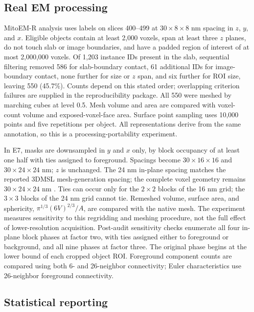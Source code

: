 \documentclass[journal]{IEEEtran}
\begin{document}
\subsection{Real EM processing}

MitoEM-R analysis uses labels on slices 400--499 at $30\times8\times8$ nm spacing in $z$, $y$, and $x$. Eligible objects contain at least 2,000 voxels, span at least three $z$ planes, do not touch slab or image boundaries, and have a padded region of interest of at most 2,000,000 voxels. Of 1,203 instance IDs present in the slab, sequential filtering removed 586 for slab-boundary contact, 61 additional IDs for image-boundary contact, none further for size or $z$ span, and six further for ROI size, leaving 550 (45.7\%). Counts depend on this stated order; overlapping criterion failures are supplied in the reproducibility package.
All 550 were meshed by marching cubes \cite{ref23} at level 0.5. Mesh volume and area are compared with voxel-count volume and exposed-voxel-face area. Surface point sampling uses 10,000 points and five repetitions per object. All representations derive from the same annotation, so this is a processing-portability experiment.

In E7, masks are downsampled in $y$ and $x$ only, by block occupancy of at least one half with ties assigned to foreground. Spacings become $30\times16\times16$ and $30\times24\times24$ nm; $z$ is unchanged. The 24 nm in-plane spacing matches the reported 3DMSL mesh-generation spacing; the complete voxel geometry remains $30\times24\times24$ nm \cite{ref20}. Ties can occur only for the $2\times2$ blocks of the 16 nm grid; the $3\times3$ blocks of the 24 nm grid cannot tie. Remeshed volume, surface area, and sphericity, $\pi^{1/3}(6V)^{2/3}/A$, are compared with the native mesh. The experiment measures sensitivity to this regridding and meshing procedure, not the full effect of lower-resolution acquisition. Post-audit sensitivity checks enumerate all four in-plane block phases at factor two, with ties assigned either to foreground or background, and all nine phases at factor three. The original phase begins at the lower bound of each cropped object ROI. Foreground component counts are compared using both 6- and 26-neighbor connectivity; Euler characteristics use 26-neighbor foreground connectivity.

\subsection{Statistical reporting}
\end{document}
